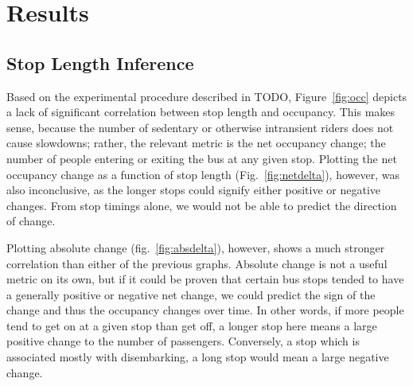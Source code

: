 \section{Results}

\subsection{Stop Length Inference}

Based on the experimental procedure described in TODO, Figure~\ref{fig:occ} depicts a lack of significant correlation between stop length and occupancy.
This makes sense, because the number of sedentary or otherwise intransient riders does not cause slowdowns; rather, the relevant metric is the net occupancy change; the number of people entering or exiting the bus at any given stop.
Plotting the net occupancy change as a function of stop length (Fig.~\ref{fig:netdelta}), however, was also inconclusive, as the longer stops could signify either positive or negative changes.
From stop timings alone, we would not be able to predict the direction of change.

Plotting absolute change (fig.~\ref{fig:absdelta}), however, shows a much stronger correlation than either of the previous graphs.
Absolute change is not a useful metric on its own, but if it could be proven that certain bus stops tended to have a generally positive or negative net change, we could predict the sign of the change and thus the occupancy changes over time.
In other words, if more people tend to get on at a given stop than get off, a longer stop here means a large positive change to the number of passengers.
Conversely, a stop which is associated mostly with disembarking, a long stop would mean a large negative change.

